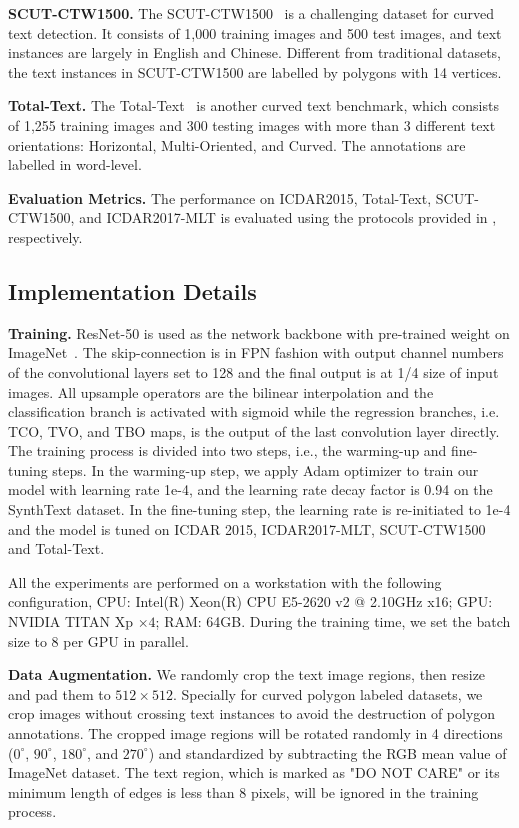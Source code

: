 \documentclass[sigconf]{acmart}
\begin{document}
\textbf{SCUT-CTW1500.} The SCUT-CTW1500~\cite{yuliang2017detecting} is a challenging dataset for curved text detection. It consists of 1,000 training images and 500 test images, and text instances are largely in English and Chinese. Different from traditional datasets, the text instances in SCUT-CTW1500 are labelled by polygons with 14 vertices.

\textbf{Total-Text.} The Total-Text~\cite{ch2017total} is another curved text benchmark, which consists of 1,255 training images and 300 testing images with more than 3 different text orientations: Horizontal, Multi-Oriented, and Curved. The annotations are labelled in word-level.



\textbf{Evaluation Metrics.} The performance on ICDAR2015, Total-Text, SCUT-CTW1500, and ICDAR2017-MLT is evaluated using the protocols provided in \cite{karatzas2015icdar, ch2017total, yuliang2017detecting, nayef2017icdar2017}, respectively.

\subsection{Implementation Details}
\textbf{Training.} ResNet-50 is used as the network backbone with pre-trained weight on ImageNet~\cite{deng2009imagenet}. The skip-connection is in FPN fashion with output channel numbers of the convolutional layers set to 128 and the final output is at 1/4 size of input images. All upsample operators are the bilinear interpolation and the classification branch is activated with sigmoid while the regression branches, i.e. TCO, TVO, and TBO maps, is the output of the last convolution layer directly. The training process is divided into two steps, i.e., the warming-up and fine-tuning steps. In the warming-up step, we apply Adam optimizer to train our model with learning rate 1e-4, and the learning rate decay factor is 0.94 on the SynthText dataset. In the fine-tuning step, the learning rate is re-initiated to 1e-4 and the model is tuned on ICDAR 2015, ICDAR2017-MLT, SCUT-CTW1500 and Total-Text.

All the experiments are performed on a workstation with the following configuration, CPU: Intel(R) Xeon(R) CPU E5-2620 v2 @ 2.10GHz x16; GPU: NVIDIA TITAN Xp $\times 4$; RAM: 64GB. During the training time, we set the batch size to 8 per GPU in parallel. 


\textbf{Data Augmentation.} We randomly crop the text image regions, then resize and pad them to $512 \times 512$. Specially for curved polygon labeled datasets, we crop images without crossing text instances to avoid the destruction of polygon annotations. The cropped image regions will be rotated randomly in 4 directions ($0^\circ$, $90^\circ$, $180^\circ$, and $270^\circ$) and standardized by subtracting the RGB mean value of ImageNet dataset. The text region, which is marked as "DO NOT CARE" or its minimum length of edges is less than 8 pixels, will be ignored in the training process.
\end{document}
